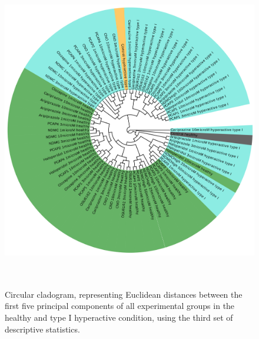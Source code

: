 \documentclass[a4paper,12pt]{article}
\begin{document}
\begin{figure}[h!]
\begin{center}
\includegraphics[width=14cm,height=14cm]{DarkApoHigh_set3_PCA_tree_A.png}
\caption{Circular cladogram, representing Euclidean distances between the first five principal components of all experimental groups in the healthy and type I hyperactive condition, using the third set of descriptive statistics.}
\end{center}
\end{figure}
\newpage
\end{document}
